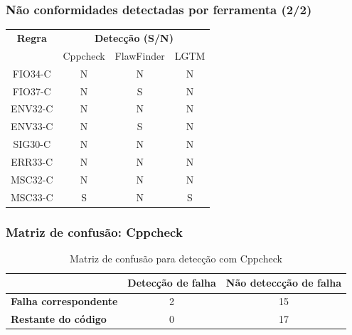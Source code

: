 \documentclass{beamer}
\begin{document}
\begin{frame}
  \frametitle{Não conformidades detectadas por ferramenta (2/2)}
  \begin{table}[]
    \begin{tabular}{@{}cccc@{}}
    \toprule
    \textbf{Regra} & \multicolumn{3}{c}{\textbf{Detecção (S/N)}} \\
                   & Cppcheck & FlawFinder & LGTM \\ \midrule
    FIO34-C        & N        & N          & N    \\ \midrule
    FIO37-C        & N        & S          & N    \\ \midrule
    ENV32-C        & N        & N          & N    \\ \midrule
    ENV33-C        & N        & S          & N    \\ \midrule
    SIG30-C        & N        & N          & N    \\ \midrule
    ERR33-C        & N        & N          & N    \\ \midrule
    MSC32-C        & N        & N          & N    \\ \midrule
    MSC33-C        & S        & N          & S    \\ \bottomrule
    \end{tabular}
    \end{table}
\end{frame}

\begin{frame}
  \frametitle{Matriz de confusão: Cppcheck}
  \begin{table}[ht]
    \hspace*{-19px}
    \begin{tabular}{@{}lcc@{}}
    \toprule
                        & \textbf{Detecção de falha} & \multicolumn{1}{l}{\textbf{Não deteccção de falha}} \\ \midrule
    \textbf{Falha correspondente} & 2                        & 15                                               \\
    \textbf{Restante do código} & 0                        & 17                                               \\ \bottomrule
    \end{tabular}
    \caption{Matriz de confusão para detecção com Cppcheck}
    \label{tab:cppcheck}
    \end{table}
\end{frame}
\end{document}
